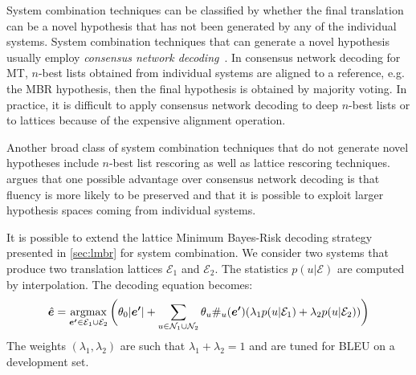 System combination techniques can be classified
by whether the final translation can be a novel hypothesis
that has not been generated by any of the individual systems.
System combination techniques that can generate
a novel hypothesis usually employ
\emph{consensus network decoding}~\citep{fiscus:1997:ASRU}.
In consensus network decoding for MT, $n$-best lists
obtained from individual systems are aligned to
a reference, e.g. the MBR hypothesis, then the final
hypothesis is obtained by majority voting.
In practice, it is difficult to apply consensus network
decoding to deep $n$-best lists or to lattices because
of the expensive alignment operation.

Another broad class of system combination techniques
that do not generate novel hypotheses
include $n$-best list rescoring as well as lattice rescoring techniques.
\citet{blackwood:2010:PHD} argues that one possible advantage over
consensus network decoding
is that fluency is more likely to be preserved and that
it is possible to exploit larger hypothesis spaces coming
from individual systems.

It is possible to extend the lattice Minimum Bayes-Risk decoding strategy
presented in \autoref{sec:lmbr} for system combination.
We consider two systems that produce two translation lattices
$\mathcal{E}_1$ and $\mathcal{E}_2$. The statistics
$p(u|\mathcal{E})$ are computed by interpolation. The decoding equation becomes:
%
\begin{equation}
  \hat{\bm{e}}=\operatorname*{argmax}_{\bm{e'} \in \mathcal{E}_1 \cup \mathcal{E}_2 } \bigg ( \theta_0|\bm{e'}|+\sum_{u \in \mathcal{N}_1 \cup \mathcal{N}_2}  \theta_u\#_u(\bm{e'}) (\lambda_{1} p(u|\mathcal{E}_1) + \lambda_2 p(u|\mathcal{E}_2)) \bigg )
\end{equation}
%
The weights $(\lambda_1,\lambda_2)$ are such that $\lambda_1+\lambda_2 = 1$ and are tuned for BLEU on a development set.

